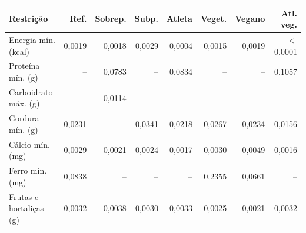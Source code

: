 \begin{tabular}{lrrrrrrr}
\toprule
Restrição & Ref. & Sobrep. & Subp. & Atleta & Veget. & Vegano & Atl. veg. \\
\midrule
Energia mín. (kcal) & 0{,}0019 & 0{,}0018 & 0{,}0029 & 0{,}0004 & 0{,}0015 & 0{,}0019 & $<$0{,}0001 \\
Proteína mín. (g) & -- & 0{,}0783 & -- & 0{,}0834 & -- & -- & 0{,}1057 \\
Carboidrato máx. (g) & -- & -0{,}0114 & -- & -- & -- & -- & -- \\
Gordura mín. (g) & 0{,}0231 & -- & 0{,}0341 & 0{,}0218 & 0{,}0267 & 0{,}0234 & 0{,}0156 \\
Cálcio mín. (mg) & 0{,}0029 & 0{,}0021 & 0{,}0024 & 0{,}0017 & 0{,}0030 & 0{,}0049 & 0{,}0016 \\
Ferro mín. (mg) & 0{,}0838 & -- & -- & -- & 0{,}2355 & 0{,}0661 & -- \\
Frutas e hortaliças (g) & 0{,}0032 & 0{,}0038 & 0{,}0030 & 0{,}0033 & 0{,}0025 & 0{,}0021 & 0{,}0032 \\
\bottomrule
\end{tabular}
